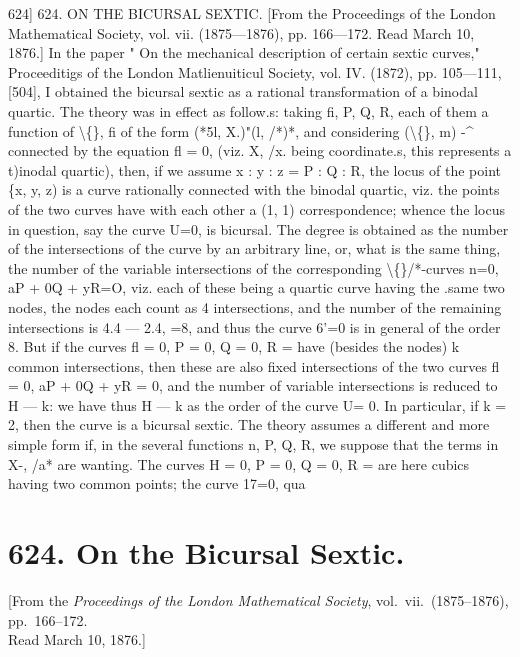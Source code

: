 \documentclass[12pt,a4paper]{article}
\begin{document}
624]
624.
ON THE
BICURSAL
SEXTIC.
[From
the Proceedings of the London Mathematical
Society,
vol.
vii.
(1875---1876),
pp. 166---172.
Read March
10,
1876.]
In the paper " On
the mechanical description of certain sextic
curves," Proceeditigs of
the London Matlienuiticul Society, vol.
IV. (1872), pp. 105---111, [504], I obtained the
bicursal
sextic
as
a
rational
transformation
of a
binodal
quartic.
The
theory was
in
effect
as
follow.s:
taking
fi, P,
Q, R, each
of them a function of \textbackslash\{\},
fi of the form (*5l, X.)"(l, /*)*,
and
considering
(\textbackslash\{\}, m)
-\textasciicircum{}
connected by the equation
fl = 0,
(viz.
X,
/x. being
coordinate.s,
this
represents
a
t)inodal
quartic),
then,
if we
assume x
: y
: z = P
: Q
: R,
the
locus
of
the
point
\{x,
y,
z)
is
a
curve
rationally
connected
with
the
binodal
quartic,
viz.
the
points
of
the
two
curves
have
with
each
other
a
(1,
1)
correspondence;
whence
the
locus
in
question,
say
the
curve
U=0,
is
bicursal.
The degree
is obtained as the
number
of
the
intersections
of
the
curve
by
an
arbitrary
line,
or,
what
is
the
same
thing, the number of the
variable
intersections of the corresponding \textbackslash\{\}/*-curves
n=0,
aP + 0Q + yR=O,
viz.
each
of these
being
a
quartic
curve
having
the
.same
two
nodes,
the
nodes each
count as 4 intersections, and the number of the remaining intersections
is 4.4 --- 2.4, =8,
and
thus
the
curve
6'=0
is
in
general
of
the
order
8.
But
if
the
curves
fl = 0,
P = 0, Q = 0, R =
have
(besides
the
nodes)
k common
intersections,
then
these
are
also
fixed
intersections
of
the
two
curves
fl = 0, aP + 0Q + yR = 0, and the
number of
variable
intersections
is
reduced
to
H --- k:
we
have
thus
H --- k
as
the
order
of
the
curve U= 0.
In
particular,
if k = 2, then the curve
is a
bicursal
sextic.
The
theory assumes
a
different
and
more
simple
form
if,
in
the
several
functions
n,
P,
Q,
R, we
suppose
that
the
terms
in
X-,
/a*
are
wanting.
The
curves H = 0,
P = 0, Q = 0, R =
are
here
cubics
having
two common
points;
the
curve
17=0, qua


\newpage
\section*{624. On the Bicursal Sextic.}

\begin{center}
\small[From the \textit{Proceedings of the London Mathematical Society}, vol.~vii.\ (1875--1876), pp.~166--172.\\Read March 10, 1876.]
\end{center}
\end{document}
